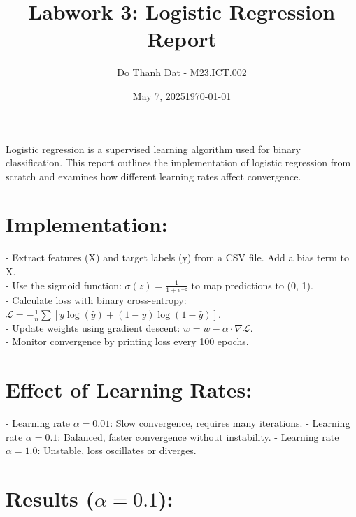 \documentclass{article}
\title{Labwork 3: Logistic Regression Report}
\author {Do Thanh Dat - M23.ICT.002}
\date{May 7, 2025}
\date{\today}
\begin{document}
\maketitle

Logistic regression is a supervised learning algorithm used for binary classification. This report outlines the implementation of logistic regression from scratch and examines how different learning rates affect convergence.\\

\section{Implementation:}
- Extract features (X) and target labels (y) from a CSV file. Add a bias term to X.\\
- Use the sigmoid function: $\sigma(z) = \frac{1}{1 + e^{-z}}$ to map predictions to (0, 1).\\
- Calculate loss with binary cross-entropy: $\mathcal{L} = -\frac{1}{n}\sum [y \log(\hat{y}) + (1-y)\log(1-\hat{y})]$.\\
- Update weights using gradient descent: $w = w - \alpha \cdot \nabla \mathcal{L}$.\\
- Monitor convergence by printing loss every 100 epochs.\\

\section{Effect of Learning Rates:}
- Learning rate $\alpha = 0.01$: Slow convergence, requires many iterations.
- Learning rate $\alpha = 0.1$: Balanced, faster convergence without instability.
- Learning rate $\alpha = 1.0$: Unstable, loss oscillates or diverges.

\section{Results (\boldmath$\alpha = 0.1$):}
\end{document}
